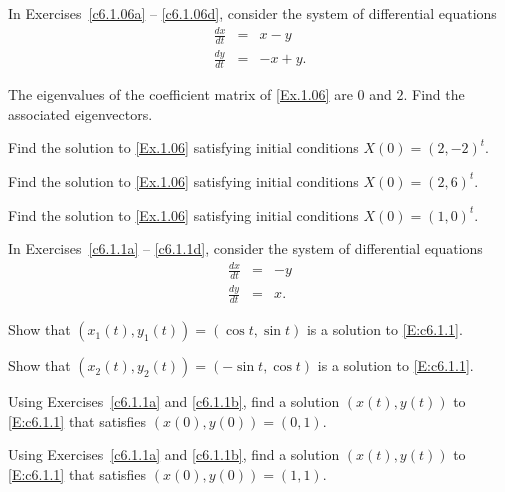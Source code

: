 \documentclass{ximera}
\begin{document}
\noindent In Exercises~\ref{c6.1.06a} -- \ref{c6.1.06d}, consider the system of
differential equations
\begin{equation} \label{Ex.1.06}
\begin{array}{rcr}
\frac{dx}{dt}  & = & x-y \\
\frac{dy}{dt}  & = & -x+y.
\end{array}
\end{equation}
\begin{exercise} \label{c6.1.06a}
The eigenvalues of the coefficient matrix of \eqref{Ex.1.06} are $0$ and $2$.
Find the associated eigenvectors.
\end{exercise}
\begin{exercise} \label{c6.1.06b}
Find the solution to \eqref{Ex.1.06} satisfying initial conditions
$X(0)=(2,-2)^t$.
\end{exercise}
\begin{exercise} \label{c6.1.06c}
Find the solution to \eqref{Ex.1.06} satisfying initial conditions
$X(0)=(2,6)^t$.
\end{exercise}
\begin{exercise} \label{c6.1.06d}
Find the solution to \eqref{Ex.1.06} satisfying initial conditions
$X(0)=(1,0)^t$.
\end{exercise}


\noindent In Exercises~\ref{c6.1.1a} -- \ref{c6.1.1d}, consider the system of
differential equations
\begin{equation} \label{E:c6.1.1}
\begin{array}{rcr}
\frac{dx}{dt}  & = & -y \\
\frac{dy}{dt}  & = &  x.
\end{array}
\end{equation}
\begin{exercise} \label{c6.1.1a}
Show that $(x_1(t),y_1(t)) = (\cos t,\sin t)$ is a solution to \eqref{E:c6.1.1}.
\end{exercise}
\begin{exercise} \label{c6.1.1b}
Show that $(x_2(t),y_2(t)) = (-\sin t,\cos t)$ is a solution to \eqref{E:c6.1.1}.
\end{exercise}
\begin{exercise} \label{c6.1.1c}
Using Exercises~\ref{c6.1.1a} and \ref{c6.1.1b}, find a solution $(x(t),y(t))$
to \eqref{E:c6.1.1} that satisfies $(x(0),y(0)) = (0,1)$.
\end{exercise}
\begin{exercise} \label{c6.1.1d}
Using Exercises~\ref{c6.1.1a} and \ref{c6.1.1b}, find a solution $(x(t),y(t))$
to \eqref{E:c6.1.1} that satisfies $(x(0),y(0)) = (1,1)$.
\end{exercise}
\end{document}
